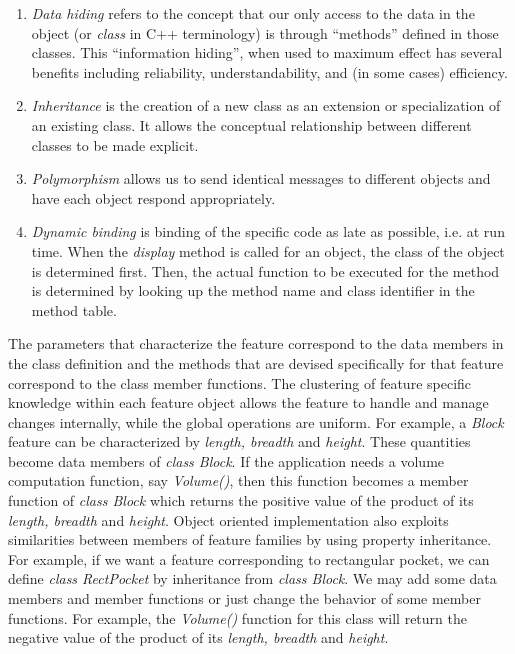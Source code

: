         \begin{enumerate}

        \item
        {\em Data hiding} refers to the concept that our only access to the
        data in the object (or {\it class} in C++ terminology)
        is through ``methods'' defined in those classes. This ``information
        hiding'', when used to maximum effect has several benefits including 
        reliability, understandability, and (in some cases) efficiency.
        \item
        {\em Inheritance} is the creation of a new class as an extension or
        specialization of an existing class. It allows the conceptual
        relationship between different classes to be made explicit.
        \item
        {\em Polymorphism} allows us to send identical messages to different
        objects and have each object respond appropriately.
        \item
        {\em Dynamic binding} is binding of the specific code as late as 
		possible, i.e. at
        run time. When the {\it display } method is called for an object, the
        class of the object is determined first. Then, the actual function to
        be executed for the method is determined by looking up the method name
        and class identifier in the method table.

        \end{enumerate}


	The parameters that characterize the feature correspond to the data members
	in the class definition and the methods that are devised specifically for
	that feature correspond to the class member functions.
    The clustering of feature specific knowledge within each feature object
    allows the feature to handle and manage changes internally,
    while the global operations are uniform.
	For example, a {\em Block} feature can be characterized by {\em length,
	breadth} and {\em height}. These quantities become data members of 
	{\em class Block}. If the application needs a volume computation function,
	say {\em Volume()}, then this function becomes a member function of 
	{\em class Block} which returns the positive value of the product of its 
	{\em length, 
	breadth } and {\em height}. Object oriented implementation also exploits
    similarities between members of feature families by using property
    inheritance.
	For example, if we want a feature corresponding to rectangular pocket, we
	can define {\em class RectPocket} by inheritance from {\em class Block}. 
	We may add some
	data members and member functions or just change the behavior of some member
	functions. For example, the {\em Volume()} function for this class will 
	return the negative value of the product of its {\em length, breadth } and 
	{\em height}.
	
